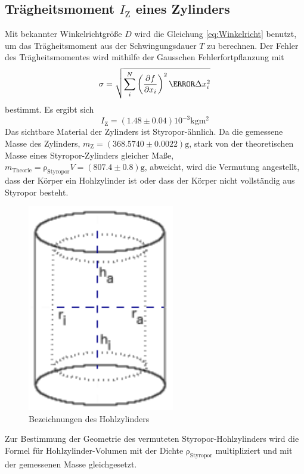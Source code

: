 \subsection{Trägheitsmoment $I_\text{Z}$ eines Zylinders}
\label{sub:traegheitsmoment_eines_zylinders}

\noindent Mit bekannter Winkelrichtgröße $D$ wird die Gleichung \eqref{eq:Winkelricht} benutzt, um das Trägheitsmoment aus der Schwingungsdauer $T$ zu berechnen. Der Fehler des Trägheitsmomentes wird mithilfe der Gausschen Fehlerfortpflanzung mit
\begin{equation}
	\label{eq:Gauss}
	\sigma=\sqrt{\sum_i^N{\left( \frac{\partial{f}}{\partial{x_i}}\right)^2\m \Delta x_i^2}}
\end{equation}bestimmt.
Es ergibt sich
\begin{equation}
	\label{wert:Zylinder}
	I_\text{Z} = (1.48\pm0.04)10^{-3} \si{\kilo\gram\meter\squared}
\end{equation}
Das sichtbare Material der Zylinders ist Styropor-ähnlich. 
Da die gemessene Masse des Zylinders, $m_\text{Z} = (368.5740\pm0.0022) \si{\gram}$, stark von der theoretischen Masse eines Styropor-Zylinders gleicher Maße, $m_\text{Theorie} = \mathup{\rho_{\text{Styropor}}}V=(807.4\pm0.8) \si{\gram}$, abweicht, 
wird die Vermutung angestellt, dass der Körper ein Hohlzylinder ist oder dass der Körper nicht vollständig aus Styropor besteht.
\begin{figure}[b]
	\label{fig:tonne}
	\centering
	\includegraphics[scale=0.5]{Bilder/Tonne.pdf}
	\caption{Bezeichnungen des Hohlzylinders}
\end{figure}
Zur Bestimmung der Geometrie des vermuteten Styropor-Hohlzylinders wird die Formel für Hohlzylinder-Volumen  mit der Dichte $\mathup{\rho_{\text{Styropor}}}$ multipliziert und mit der gemessenen Masse gleichgesetzt. 
